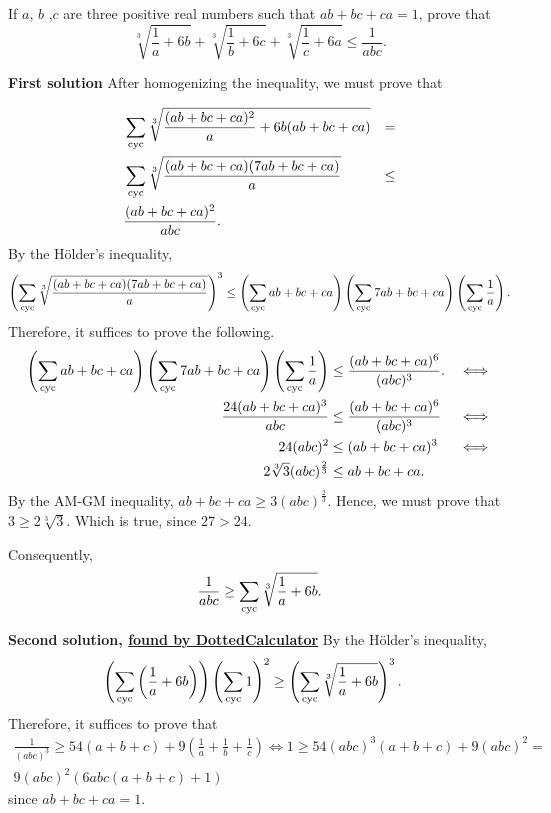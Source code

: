 \documentclass[12pt]{article}
\begin{document}
\begin{problem}
If $a$, $b$ ,$c$ are three positive real numbers such that $ab+bc+ca = 1$, prove that\[ \sqrt[3]{ \frac{1}{a} + 6b} + \sqrt[3]{\frac{1}{b} + 6c} + \sqrt[3]{\frac{1}{c} + 6a } \leq \frac{1}{abc}.  \]
\end{problem}

\textbf{\textcolor{color1}{First solution}} After homogenizing the inequality, we must prove that

\begin{align*}
	 & \sum_{\text{cyc}} \sqrt[3]{\frac{(ab+bc+ca)^2}{a}+6b(ab+bc+ca)} & =   \\
	 & \sum_{\text{cyc}} \sqrt[3]{\frac{(ab+bc+ca)(7ab+bc+ca)}{a}}     & \le \\
	 & \frac{(ab+bc+ca)^2}{abc}.
\end{align*}
By the Hölder's inequality,
\begin{align*}
	\left(\sum_{\text{cyc}} \sqrt[3]{\frac{(ab+bc+ca)(7ab+bc+ca)}{a}}\right)^3 \le \left(\sum_{\text{cyc}} ab+bc+ca\right)\left(\sum_{\text{cyc}} 7ab+bc+ca\right)\left(\sum_{\text{cyc}} \frac{1}{a}\right).
\end{align*}
Therefore, it suffices to prove the following.
\begin{align*}
	\left(\sum_{\text{cyc}} ab+bc+ca\right)\left(\sum_{\text{cyc}} 7ab+bc+ca\right)\left(\sum_{\text{cyc}} \frac{1}{a}\right) & \le \frac{(ab+bc+ca)^6}{(abc)^3}. & \iff \\
	\frac{24(ab+bc+ca)^3}{abc}                                                         & \le \frac{(ab+bc+ca)^6}{(abc)^3}  & \iff \\
	24(abc)^2                                                                          & \le (ab+bc+ca)^3                  & \iff \\
	2\sqrt[3]{3}(abc)^{\frac{2}{3}}                                                    & \le ab+bc+ca.
\end{align*}
By the AM-GM inequality, $ab+bc+ca \ge 3(abc)^{\frac{2}{3}}$. Hence, we must prove that $3 \ge 2\sqrt[3]{3}$.
Which is true, since $27>24$.

Consequently,
\[
	\frac{1}{abc} \ge \sum_{\text{cyc}} \sqrt[3]{\frac{1}{a} +6b}.
\]

\textbf{\textcolor{color1}{Second solution, \href{https://artofproblemsolving.com/community/c6h30865p23434282}{found by DottedCalculator}}} By the Hölder's inequality,
\begin{align*}
	\left(\sum_{\text{cyc}} \left(\frac{1}{a}+6b\right)\right)\left(\sum_{\text{cyc}} 1\right)^2 & \ge \left(\sum_{\text{cyc}} \sqrt[3]{\frac{1}{a}+6b}\right)^3.
\end{align*}
Therefore, it suffices to prove that
\begin{align*}
	\frac{1}{(abc)^3} \ge 54(a+b+c)+9\left(\frac{1}{a}+\frac{1}{b}+\frac{1}{c}\right) \iff
	1 \ge 54(abc)^3(a+b+c) + 9(abc)^2 = \\
	9(abc)^2(6abc(a+b+c)+1)
\end{align*}
since $ab+bc+ca=1$.
\end{document}

